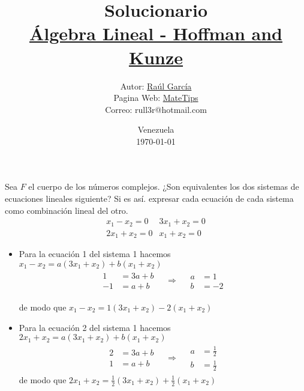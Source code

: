 \documentclass[10pt,a4paper]{jhwhw}
\author{Autor: \href{https://www.facebook.com/ruller}{Raúl García}\\Pagina Web: \href{https://rull3r.github.io/}{MateTips}\\Correo: rull3r@hotmail.com}
\date{Venezuela\\ \today \\}
\title{Solucionario \\\href{https://books.google.co.ve/books?id=XPcoPwAACAAJ}{Álgebra Lineal - Hoffman and Kunze}\\}
\begin{document}
	
	\problema{ }\label{pro:2}
	Sea $F$ el cuerpo de los números complejos. ¿Son equivalentes los dos sistemas de ecuaciones lineales siguiente? Si es así. expresar cada ecuación de cada sistema como combinación lineal del otro.
	\begin{eqnarray*}
		x_1-x_2=0 & 3x_1+x_2=0\\
		2x_1+x_2=0 & x_1+x_2=0
	\end{eqnarray*}

	\solution
	
	\begin{itemize}
		\item Para la ecuación 1 del sistema 1 hacemos $x_1-x_2=a(3x_1+x_2)+b(x_1+x_2)$
		\begin{align*}
		\begin{aligned}
		1&= 3a+b \\
		-1&=a+b
		\end{aligned}
		\quad
		\Rightarrow
		\quad
		\begin{aligned}
		a&= 1 \\
		b&= -2
		\end{aligned}
		\end{align*}
		
		de modo que $x_1-x_2=1(3x_1+x_2)-2(x_1+x_2)$
		
		\item Para la ecuación 2 del sistema 1 hacemos $2x_1+x_2=a(3x_1+x_2)+b(x_1+x_2)$
		\begin{align*}
		\begin{aligned}
		2&= 3a+b \\
		1&=a+b
		\end{aligned}
		\quad
		\Rightarrow
		\quad
		\begin{aligned}
		a&=\frac{1}{2} \\
		b&= \frac{1}{2}
		\end{aligned}
		\end{align*}
		de modo que $2x_1+x_2=\frac{1}{2}(3x_1+x_2)+\frac{1}{2}(x_1+x_2)$
		

\end{itemize}
\end{document}
